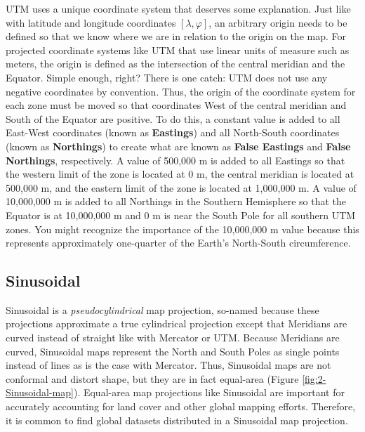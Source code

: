\documentclass[
]{book}
\begin{document}
UTM uses a unique coordinate system that deserves some explanation. Just like with latitude and longitude coordinates \([λ,φ]\), an arbitrary origin needs to be defined so that we know where we are in relation to the origin on the map. For projected coordinate systems like UTM that use linear units of measure such as meters, the origin is defined as the intersection of the central meridian and the Equator. Simple enough, right? There is one catch: UTM does not use any negative coordinates by convention. Thus, the origin of the coordinate system for each zone must be moved so that coordinates West of the central meridian and South of the Equator are positive. To do this, a constant value is added to all East-West coordinates (known as \textbf{Eastings}) and all North-South coordinates (known as \textbf{Northings}) to create what are known as \textbf{False Eastings} and \textbf{False Northings}, respectively. A value of 500,000 m is added to all Eastings so that the western limit of the zone is located at 0 m, the central meridian is located at 500,000 m, and the eastern limit of the zone is located at 1,000,000 m. A value of 10,000,000 m is added to all Northings in the Southern Hemisphere so that the Equator is at 10,000,000 m and 0 m is near the South Pole for all southern UTM zones. You might recognize the importance of the 10,000,000 m value because this represents approximately one-quarter of the Earth's North-South circumference.

\hypertarget{sinusoidal}{%
\subsection{Sinusoidal}\label{sinusoidal}}

Sinusoidal is a \emph{pseudocylindrical} map projection, so-named because these projections approximate a true cylindrical projection except that Meridians are curved instead of straight like with Mercator or UTM. Because Meridians are curved, Sinusoidal maps represent the North and South Poles as single points instead of lines as is the case with Mercator. Thus, Sinusoidal maps are not conformal and distort shape, but they are in fact equal-area (Figure \ref{fig:2-Sinusoidal-map}). Equal-area map projections like Sinusoidal are important for accurately accounting for land cover and other global mapping efforts. Therefore, it is common to find global datasets distributed in a Sinusoidal map projection.
\end{document}
